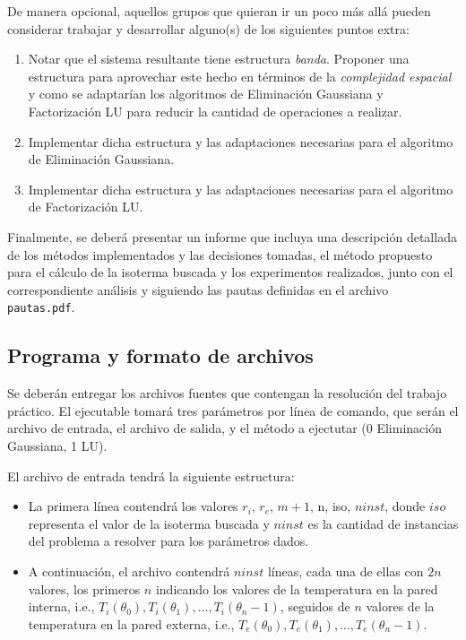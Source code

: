 \begin{appendices}
      De manera opcional, aquellos grupos que quieran ir un poco más allá pueden considerar trabajar y desarrollar alguno(s) de los siguientes puntos extra:
      \begin{enumerate}
        \item Notar que el sistema resultante tiene estructura \emph{banda}. Proponer una estructura para aprovechar este hecho en términos de la \emph{complejidad espacial} y como se adaptarían los algoritmos de Eliminación Gaussiana y Factorización LU para reducir la cantidad de operaciones a realizar.
        \item Implementar dicha estructura y las adaptaciones necesarias para el algoritmo de Eliminación Gaussiana.
        \item Implementar dicha estructura y las adaptaciones necesarias para el algoritmo de Factorización LU.
      \end{enumerate}

      Finalmente, se deberá presentar un informe que incluya una descripción detallada de los métodos implementados y las decisiones tomadas, el método propuesto para el cálculo de la isoterma buscada y los experimentos realizados, junto con el correspondiente análisis y siguiendo las pautas definidas en el archivo \texttt{pautas.pdf}.

    \subsection{Programa y formato de archivos}
      Se deberán entregar los archivos fuentes que contengan la resolución del trabajo práctico. El ejecutable tomará tres parámetros por línea de comando, que serán el archivo de entrada, el archivo de salida, y el método a ejectutar (0 Eliminación Gaussiana, 1 LU).

      El archivo de entrada tendrá la siguiente estructura:
      \begin{itemize}
        \item La primera línea contendrá los valores $r_i$, $r_e$, $m + 1$, n, iso, $ninst$, donde $iso$ representa el valor de la isoterma buscada y $ninst$ es la cantidad de instancias del problema a resolver para los parámetros dados.
        \item A continuación, el archivo contendrá $ninst$ líneas, cada una de ellas con $2 n$ valores, los primeros $n$ indicando los valores de la temperatura en la pared interna, i.e., $T_i(\theta_0), T_i(\theta_1), \dots, T_i(\theta_n-1)$, seguidos de $n$ valores de la temperatura en la pared externa, i.e., $T_e(\theta_0), T_e(\theta_1), \dots, T_e(\theta_n-1)$.
      \end{itemize}


\end{appendices}
